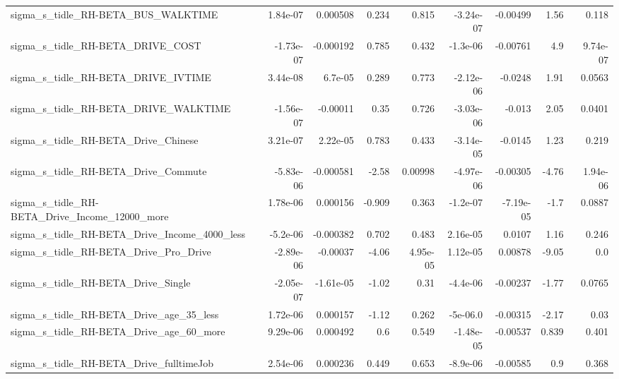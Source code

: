 \begin{tabular}{lrrrrrrrr}
sigma\_s\_tidle\_RH-BETA\_BUS\_WALKTIME                 &    1.84e-07 &     0.000508 &     0.234 &    0.815 &  -3.24e-07 &    -0.00499 &         1.56 &         0.118 \\
sigma\_s\_tidle\_RH-BETA\_DRIVE\_COST                   &   -1.73e-07 &    -0.000192 &     0.785 &    0.432 &   -1.3e-06 &    -0.00761 &          4.9 &      9.74e-07 \\
sigma\_s\_tidle\_RH-BETA\_DRIVE\_IVTIME                 &    3.44e-08 &      6.7e-05 &     0.289 &    0.773 &  -2.12e-06 &     -0.0248 &         1.91 &        0.0563 \\
sigma\_s\_tidle\_RH-BETA\_DRIVE\_WALKTIME               &   -1.56e-07 &     -0.00011 &      0.35 &    0.726 &  -3.03e-06 &      -0.013 &         2.05 &        0.0401 \\
sigma\_s\_tidle\_RH-BETA\_Drive\_Chinese                &    3.21e-07 &     2.22e-05 &     0.783 &    0.433 &  -3.14e-05 &     -0.0145 &         1.23 &         0.219 \\
sigma\_s\_tidle\_RH-BETA\_Drive\_Commute                &   -5.83e-06 &    -0.000581 &     -2.58 &  0.00998 &  -4.97e-06 &    -0.00305 &        -4.76 &      1.94e-06 \\
sigma\_s\_tidle\_RH-BETA\_Drive\_Income\_12000\_more      &    1.78e-06 &     0.000156 &    -0.909 &    0.363 &   -1.2e-07 &   -7.19e-05 &         -1.7 &        0.0887 \\
sigma\_s\_tidle\_RH-BETA\_Drive\_Income\_4000\_less       &    -5.2e-06 &    -0.000382 &     0.702 &    0.483 &   2.16e-05 &      0.0107 &         1.16 &         0.246 \\
sigma\_s\_tidle\_RH-BETA\_Drive\_Pro\_Drive              &   -2.89e-06 &     -0.00037 &     -4.06 & 4.95e-05 &   1.12e-05 &     0.00878 &        -9.05 &           0.0 \\
sigma\_s\_tidle\_RH-BETA\_Drive\_Single                 &   -2.05e-07 &    -1.61e-05 &     -1.02 &     0.31 &   -4.4e-06 &    -0.00237 &        -1.77 &        0.0765 \\
sigma\_s\_tidle\_RH-BETA\_Drive\_age\_35\_less            &    1.72e-06 &     0.000157 &     -1.12 &    0.262 &   -5e-06.0 &    -0.00315 &        -2.17 &          0.03 \\
sigma\_s\_tidle\_RH-BETA\_Drive\_age\_60\_more            &    9.29e-06 &     0.000492 &       0.6 &    0.549 &  -1.48e-05 &    -0.00537 &        0.839 &         0.401 \\
sigma\_s\_tidle\_RH-BETA\_Drive\_fulltimeJob            &    2.54e-06 &     0.000236 &     0.449 &    0.653 &   -8.9e-06 &    -0.00585 &          0.9 &         0.368 \\

\end{tabular}
